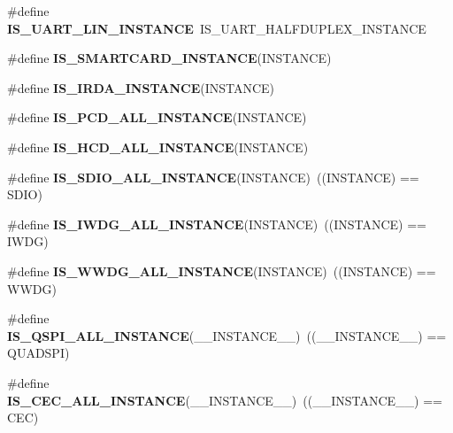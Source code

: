 \begin{DoxyCompactItemize}
\mbox{\label{group___exported__macros_gaf7905bb5a02acf0e92ddf40bdd8dcdc0}} 
\#define {\bfseries I\+S\+\_\+\+U\+A\+R\+T\+\_\+\+L\+I\+N\+\_\+\+I\+N\+S\+T\+A\+N\+CE}~I\+S\+\_\+\+U\+A\+R\+T\+\_\+\+H\+A\+L\+F\+D\+U\+P\+L\+E\+X\+\_\+\+I\+N\+S\+T\+A\+N\+CE
\item 
\#define {\bfseries I\+S\+\_\+\+S\+M\+A\+R\+T\+C\+A\+R\+D\+\_\+\+I\+N\+S\+T\+A\+N\+CE}(I\+N\+S\+T\+A\+N\+CE)
\item 
\#define {\bfseries I\+S\+\_\+\+I\+R\+D\+A\+\_\+\+I\+N\+S\+T\+A\+N\+CE}(I\+N\+S\+T\+A\+N\+CE)
\item 
\#define {\bfseries I\+S\+\_\+\+P\+C\+D\+\_\+\+A\+L\+L\+\_\+\+I\+N\+S\+T\+A\+N\+CE}(I\+N\+S\+T\+A\+N\+CE)
\item 
\#define {\bfseries I\+S\+\_\+\+H\+C\+D\+\_\+\+A\+L\+L\+\_\+\+I\+N\+S\+T\+A\+N\+CE}(I\+N\+S\+T\+A\+N\+CE)
\item 
\mbox{\label{group___exported__macros_ga73932cb2c83be6be1884d3cba2fc0063}} 
\#define {\bfseries I\+S\+\_\+\+S\+D\+I\+O\+\_\+\+A\+L\+L\+\_\+\+I\+N\+S\+T\+A\+N\+CE}(I\+N\+S\+T\+A\+N\+CE)~((I\+N\+S\+T\+A\+N\+CE) == S\+D\+IO)
\item 
\mbox{\label{group___exported__macros_gad9ec4c52f0572ee67d043e006f1d5e39}} 
\#define {\bfseries I\+S\+\_\+\+I\+W\+D\+G\+\_\+\+A\+L\+L\+\_\+\+I\+N\+S\+T\+A\+N\+CE}(I\+N\+S\+T\+A\+N\+CE)~((I\+N\+S\+T\+A\+N\+CE) == I\+W\+DG)
\item 
\mbox{\label{group___exported__macros_gac2a8aaec233e19987232455643a04d6f}} 
\#define {\bfseries I\+S\+\_\+\+W\+W\+D\+G\+\_\+\+A\+L\+L\+\_\+\+I\+N\+S\+T\+A\+N\+CE}(I\+N\+S\+T\+A\+N\+CE)~((I\+N\+S\+T\+A\+N\+CE) == W\+W\+DG)
\item 
\mbox{\label{group___exported__macros_ga3ddb10b5455f3b1414b3ecd754ef723a}} 
\#define {\bfseries I\+S\+\_\+\+Q\+S\+P\+I\+\_\+\+A\+L\+L\+\_\+\+I\+N\+S\+T\+A\+N\+CE}(\+\_\+\+\_\+\+I\+N\+S\+T\+A\+N\+C\+E\+\_\+\+\_\+)~((\+\_\+\+\_\+\+I\+N\+S\+T\+A\+N\+C\+E\+\_\+\+\_\+) == Q\+U\+A\+D\+S\+PI)
\item 
\mbox{\label{group___exported__macros_ga5a2f0c43702d75ac8a33597e2f72f611}} 
\#define {\bfseries I\+S\+\_\+\+C\+E\+C\+\_\+\+A\+L\+L\+\_\+\+I\+N\+S\+T\+A\+N\+CE}(\+\_\+\+\_\+\+I\+N\+S\+T\+A\+N\+C\+E\+\_\+\+\_\+)~((\+\_\+\+\_\+\+I\+N\+S\+T\+A\+N\+C\+E\+\_\+\+\_\+) == C\+EC)

\end{DoxyCompactItemize}

